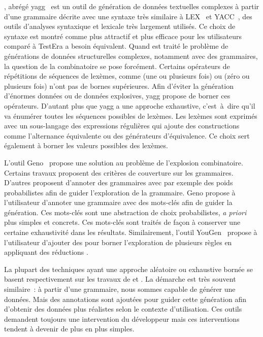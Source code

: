 , abrégé yagg~ est
un outil de génération de données textuelles complexes à partir d'une grammaire
décrite avec une syntaxe très similaire à LEX~ et
YACC~, des outils d'analyses syntaxique et lexicale très
largement utilisés. Ce choix de syntaxe est montré comme plus attractif et plus
efficace pour les utilisateurs comparé à TestEra a besoin équivalent. Quand est
traité le problème de générations de données structurelles complexes, notamment
avec des grammaires, la question de la combinatoire se pose forcément. Certains
opérateurs de répétitions de séquences de lexèmes, comme \code{+} (une ou
plusieurs fois) ou \code{*} (zéro ou plusieurs fois) n'ont pas de bornes
supérieures. Afin d'éviter la génération d'énormes données ou de données
explosives, yagg propose de borner ces opérateurs. D'autant plus que yagg a une
approche exhaustive, c'est~à~dire qu'il va énumérer toutes les séquences
possibles de lexèmes.  Les lexèmes sont exprimés avec un sous-langage des
expressions régulières qui ajoute des constructions comme l'alternance
équivalente ou des générateurs d'équivalence.  Ce choix sert également à borner
les valeurs possibles des lexèmes.

L'outil Geno~ propose une solution au problème de l'explosion
combinatoire. Certains travaux proposent des critères de couverture sur les
grammaires. D'autres proposent d'annoter des grammaires avec par exemple des
poids probabilistes afin de guider l'exploration de la grammaire. Geno propose à
l'utilisateur d'annoter une grammaire avec des mots-clés afin de guider la
génération. Ces mots-clés sont une abstraction de choix probabilistes, {\em a
priori} plus simples et concrets. Ces mots-clés sont traités de façon à
conserver une certaine exhaustivité dans les résultats. Similairement, l'outil
YouGen~ propose à l'utilisateur d'ajouter des
 pour borner l'exploration de plusieurs règles en appliquant des
réductions .

La plupart des techniques ayant une approche aléatoire ou exhaustive bornée se
basent respectivement sur les travaux de  et
. La démarche est très souvent similaire~: à partir d'une
grammaire, nous sommes capable de générer une données. Mais des annotations sont
ajoutées pour guider cette génération afin d'obtenir des données plus réalistes
selon le contexte d'utilisation. Ces outils demandent toujours une intervention
du développeur mais ces interventions tendent à devenir de plus en plus simples.


